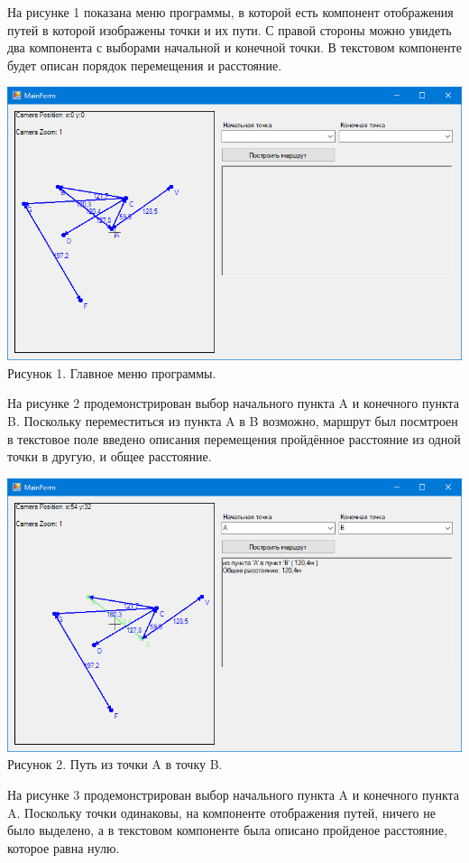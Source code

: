 \documentclass[a4paper,14pt, Times New Roman]{extarticle}
\begin{document}
На рисунке 1 показана меню программы, в которой есть компонент отображения путей в которой изображены точки и их пути. С правой стороны можно увидеть два компонента с выборами начальной и конечной точки. В текстовом компоненте будет описан порядок перемещения и расстояние.

\begin{center}
\includegraphics[width=1\textwidth]{menu}
Рисунок 1. Главное меню программы.
\end{center}

На рисунке 2 продемонстрирован выбор начального пункта A и конечного пункта B. Поскольку переместиться из пункта A в B возможно, маршрут был посмтроен в текстовое поле введено описания перемещения пройдённое расстояние из одной точки в другую, и общее расстояние.

\begin{center}
\includegraphics[width=1\textwidth]{atob}
Рисунок 2. Путь из точки A в точку B.
\end{center}

На рисунке 3 продемонстрирован выбор начального пункта A и конечного пункта A. Поскольку точки одинаковы, на компоненте отображения путей, ничего не было выделено, а в текстовом компоненте была описано пройденое расстояние, которое равна нулю.
\end{document}
